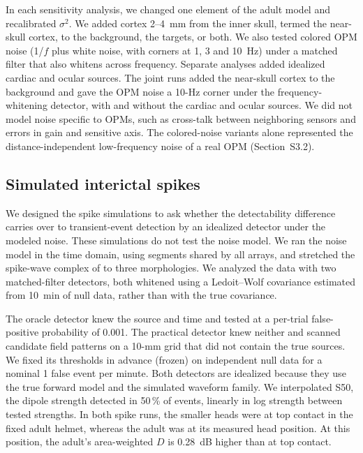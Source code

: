 \documentclass[preprint,12pt,authoryear,a4paper]{elsarticle}
\begin{document}
In each sensitivity analysis, we changed one element of the adult model and recalibrated $\sigma^{2}$. We added cortex 2--4~mm from the inner skull, termed the near-skull cortex, to the background, the targets, or both. We also tested colored OPM noise (1/$f$ plus white noise, with corners at 1, 3 and 10~Hz) under a matched filter that also whitens across frequency. Separate analyses added idealized cardiac and ocular sources. The joint runs added the near-skull cortex to the background and gave the OPM noise a 10-Hz corner under the frequency-whitening detector, with and without the cardiac and ocular sources. We did not model noise specific to OPMs, such as cross-talk between neighboring sensors and errors in gain and sensitive axis. The colored-noise variants alone represented the distance-independent low-frequency noise of a real OPM (Section~S3.2).

\subsection{Simulated interictal spikes}\label{sec:spikes}

We designed the spike simulations to ask whether the detectability difference carries over to transient-event detection by an idealized detector under the modeled noise. These simulations do not test the noise model. We ran the noise model in the time domain, using segments shared by all arrays, and stretched the spike-wave complex of \citet{hunold2016} to three morphologies. We analyzed the data with two matched-filter detectors, both whitened using a Ledoit--Wolf covariance \citep{ledoit2004} estimated from 10~min of null data, rather than with the true covariance.

The oracle detector knew the source and time and tested at a per-trial false-positive probability of 0.001. The practical detector knew neither and scanned candidate field patterns on a 10-mm grid that did not contain the true sources. We fixed its thresholds in advance (frozen) on independent null data for a nominal 1 false event per minute. Both detectors are idealized because they use the true forward model and the simulated waveform family. We interpolated S50, the dipole strength detected in 50\,\% of events, linearly in log strength between tested strengths. In both spike runs, the smaller heads were at top contact in the fixed adult helmet, whereas the adult was at its measured head position. At this position, the adult's area-weighted $D$ is 0.28~dB higher than at top contact.
\end{document}
